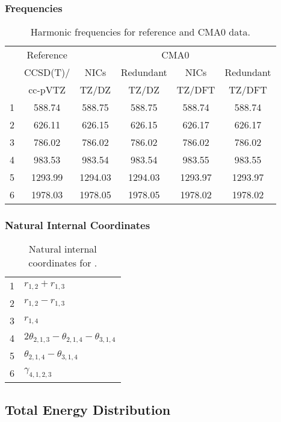 \documentclass[10pt,oneside]{article}
\begin{document}
\begin{table}[h!]
\subsubsection*{Frequencies}
\centering
\caption{Harmonic frequencies for reference and CMA0 data.}
\begin{tabular}{cccccc}
\toprule
{} & Reference & \multicolumn{4}{c}{CMA0} \\
{} &  CCSD(T)/ &    NICs &  Redundant &    NICs & Redundant \\
{} &   cc-pVTZ &   TZ/DZ &      TZ/DZ &  TZ/DFT &    TZ/DFT \\
\midrule
1 &    588.74 &  588.75 &     588.75 &  588.74 &    588.74 \\
2 &    626.11 &  626.15 &     626.15 &  626.17 &    626.17 \\
3 &    786.02 &  786.02 &     786.02 &  786.02 &    786.02 \\
4 &    983.53 &  983.54 &     983.54 &  983.55 &    983.55 \\
5 &   1293.99 & 1294.03 &    1294.03 & 1293.97 &   1293.97 \\
6 &   1978.03 & 1978.05 &    1978.05 & 1978.02 &   1978.02 \\
\bottomrule
\end{tabular}
\end{table}

\begin{table}[h!]
\subsubsection*{Natural Internal Coordinates}
\centering
\caption{Natural internal coordinates for .}
\small
\begin{tabular}{ll}
\toprule
  1   & $r_{1,2} + r_{1,3}$ \\
  2   & $r_{1,2} - r_{1,3}$ \\
  3   & $r_{1,4}$ \\
  4   & $2\theta_{2,1,3} - \theta_{2,1,4} - \theta_{3,1,4}$ \\
  5   & $\theta_{2,1,4} - \theta_{3,1,4}$ \\
  6   & $\gamma_{4,1,2,3}$ \\
\bottomrule
\end{tabular}
\end{table}

\begin{table}
\subsection*{Total Energy Distribution}
\centering\end{table}
\end{document}
